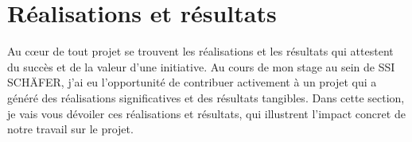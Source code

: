\documentclass[a4paper, 12pt, french]{article}
\begin{document}
				
				
				
			

		\newpage

		\section{Réalisations et résultats}
			Au cœur de tout projet se trouvent les réalisations et les résultats qui attestent du succès et de la valeur d'une initiative. Au cours de mon stage au sein de SSI SCHÄFER, j'ai eu l'opportunité de contribuer activement à un projet qui a généré des réalisations significatives et des résultats tangibles. Dans cette section, je vais vous dévoiler ces réalisations et résultats, qui illustrent l'impact concret de notre travail sur le projet.\\
\end{document}
